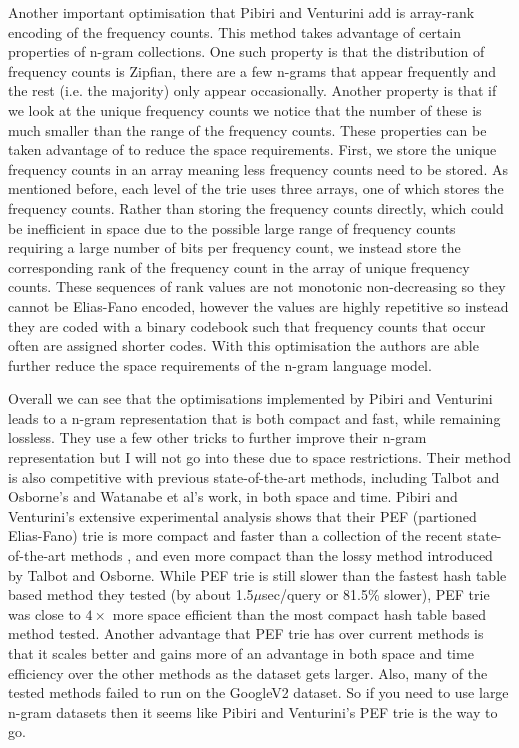 \documentclass[sigconf, nonacm=true]{acmart}
\begin{document}

Another important optimisation that Pibiri and Venturini add is array-rank encoding of the frequency counts. This method takes advantage of certain properties of n-gram collections. One such property is that the distribution of frequency counts is Zipfian, there are a few n-grams that appear frequently and the rest (i.e. the majority) only appear occasionally. Another property is that if we look at the unique frequency counts we notice that the number of these is much smaller than the range of the frequency counts. These properties can be taken advantage of to reduce the space requirements. First, we store the unique frequency counts in an array meaning less frequency counts need to be stored. As mentioned before, each level of the trie uses three arrays, one of which stores the frequency counts. Rather than storing the frequency counts directly, which could be inefficient in space due to the possible large range of frequency counts requiring a large number of bits per frequency count, we instead store the corresponding rank of the frequency count in the array of unique frequency counts. These sequences of rank values are not monotonic non-decreasing so they cannot be Elias-Fano encoded, however the values are highly repetitive so instead they are coded with a binary codebook such that frequency counts that occur often are assigned shorter codes. With this optimisation the authors are able further reduce the space requirements of the n-gram language model.

Overall we can see that the optimisations implemented by Pibiri and Venturini leads to a n-gram representation that is both compact and fast, while remaining lossless. They use a few other tricks to further improve their n-gram representation but I will not go into these due to space restrictions. Their method is also competitive with previous state-of-the-art methods, including Talbot and Osborne's and Watanabe et al's work, in both space and time. Pibiri and Venturini's extensive experimental analysis shows that their PEF (partioned Elias-Fano) trie is more compact and faster than a collection of the recent state-of-the-art methods \cite{talbot2007randomised, watanabe2009succinct, pauls2011faster}, and even more compact than the lossy method introduced by Talbot and Osborne. While PEF trie is still slower than the fastest hash table based method they tested (by about 1.5$\mu$sec/query or 81.5\% slower), PEF trie was close to $4\times$ more space efficient than the most compact hash table based method tested. Another advantage that PEF trie has over current methods is that it scales better and gains more of an advantage in both space and time efficiency over the other methods as the dataset gets larger. Also, many of the tested methods failed to run on the GoogleV2 dataset. So if you need to use large n-gram datasets then it seems like Pibiri and Venturini's PEF trie is the way to go. 
\end{document}
